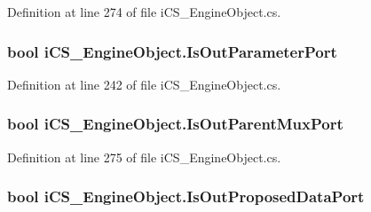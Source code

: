 Definition at line 274 of file i\+C\+S\+\_\+\+Engine\+Object.\+cs.

\hypertarget{classi_c_s___engine_object_ad78ade2d6f30073cc6a516993c3b93cd}{
\subsubsection[{Is\+Out\+Parameter\+Port}]{\setlength{\rightskip}{0pt plus 5cm}bool i\+C\+S\+\_\+\+Engine\+Object.\+Is\+Out\+Parameter\+Port\hspace{0.3cm}{\ttfamily [get]}}}\label{classi_c_s___engine_object_ad78ade2d6f30073cc6a516993c3b93cd}


Definition at line 242 of file i\+C\+S\+\_\+\+Engine\+Object.\+cs.

\hypertarget{classi_c_s___engine_object_abe7934ee519e9b68eaca441a02287c0a}{
\subsubsection[{Is\+Out\+Parent\+Mux\+Port}]{\setlength{\rightskip}{0pt plus 5cm}bool i\+C\+S\+\_\+\+Engine\+Object.\+Is\+Out\+Parent\+Mux\+Port\hspace{0.3cm}{\ttfamily [get]}}}\label{classi_c_s___engine_object_abe7934ee519e9b68eaca441a02287c0a}


Definition at line 275 of file i\+C\+S\+\_\+\+Engine\+Object.\+cs.

\hypertarget{classi_c_s___engine_object_a426d338afd793d3168567c275f285b69}{
\subsubsection[{Is\+Out\+Proposed\+Data\+Port}]{\setlength{\rightskip}{0pt plus 5cm}bool i\+C\+S\+\_\+\+Engine\+Object.\+Is\+Out\+Proposed\+Data\+Port\hspace{0.3cm}{\ttfamily [get]}}}\label{classi_c_s___engine_object_a426d338afd793d3168567c275f285b69}


